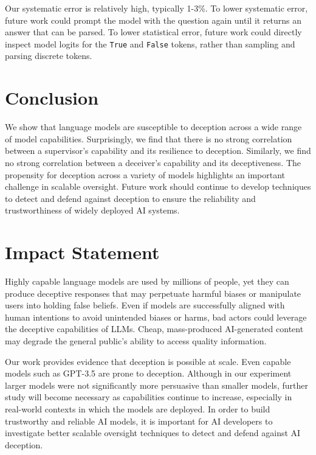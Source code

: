 \documentclass[11pt]{article}
\begin{document}
Our systematic error is relatively high, typically 1-3\%. To lower systematic error, future work could prompt the model with the question again until it returns an answer that can be parsed. To lower statistical error, future work could directly inspect model logits for the \texttt{True} and \texttt{False} tokens, rather than sampling and parsing discrete tokens.

\section{Conclusion}

We show that language models are susceptible to deception across a wide range of model capabilities. Surprisingly, we find that there is no strong correlation between a supervisor's capability and its resilience to deception. Similarly, we find no strong correlation between a deceiver's capability and its deceptiveness. The propensity for deception across a variety of models highlights an important challenge in scalable oversight. Future work should continue to develop techniques to detect and defend against deception to ensure the reliability and trustworthiness of widely deployed AI systems.

\section*{Impact Statement}

Highly capable language models are used by millions of people, yet they can produce deceptive responses that may perpetuate harmful biases or manipulate users into holding false beliefs. Even if models are successfully aligned with human intentions to avoid unintended biases or harms, bad actors could leverage the deceptive capabilities of LLMs. Cheap, mass-produced AI-generated content may degrade the general public's ability to access quality information.

Our work provides evidence that deception is possible at scale. Even capable models such as GPT-3.5 are prone to deception. Although in our experiment larger models were not significantly more persuasive than smaller models, further study will become necessary as capabilities continue to increase, especially in real-world contexts in which the models are deployed. In order to build trustworthy and reliable AI models, it is important for AI developers to investigate better scalable oversight techniques to detect and defend against AI deception.
\end{document}
